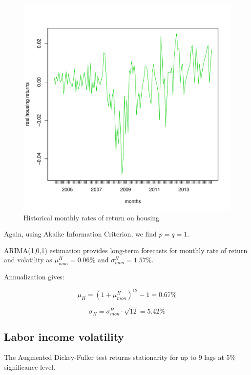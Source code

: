 \documentclass[]{elsarticle}
\begin{document}
\begin{appendix}
\begin{figure}[h!]
	\centering
	\includegraphics[scale=0.3]{figs/reidindiff.pdf}
	\caption{Historical monthly rates of return on housing}
	\label{fig:reidindiff}
\end{figure}

Again, using Akaike Information Criterion, we find $p=q=1$.

ARIMA(1,0,1) estimation provides long-term forecasts for monthly rate of return and volatility as $\mu^H_{mon} = 0.06\%$ and $\sigma^H_{mon} = 1.57\%$.

Annualization gives:

\begin{equation}
	\mu_H = (1 + \mu^H_{mon})^{12} - 1= 0.67\%
\end{equation}

\begin{equation}
	\sigma_H = \sigma^H_{mon} \cdot \sqrt{12} = 5.42 \%
\end{equation}


\subsection{Labor income volatility}
\label{paramcalibz}
The Augmented Dickey-Fuller test returns stationarity for up to 9 lags at $5\%$ significance level. 


\end{appendix}
\end{document}
